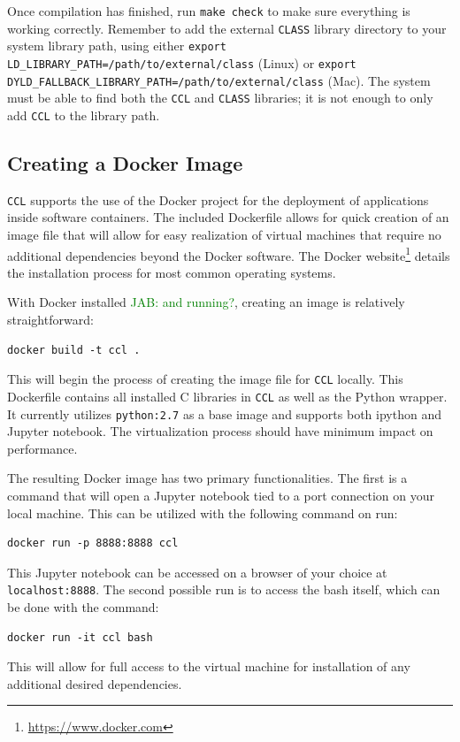 \documentclass[\docopts]{\docclass}
\newcommand{\jab}[1]{\textcolor{green}{JAB: #1}}
\begin{document}
Once compilation has finished, run {\tt make check} to make sure everything is working correctly. Remember to add the external {\tt CLASS} library directory to your system library path, using either {\tt export LD\_LIBRARY\_PATH=/path/to/external/class} (Linux) or {\tt export DYLD\_FALLBACK\_LIBRARY\_PATH=/path/to/external/class} (Mac). The system must be able to find both the {\tt CCL} and {\tt CLASS} libraries; it is not enough to only add {\tt CCL} to the library path.

\subsection{Creating a Docker Image}
{\tt CCL} supports the use of the Docker project for the deployment of applications inside software containers. The included Dockerfile allows for quick creation of an image file that will allow for easy realization of virtual machines that require no additional dependencies beyond the Docker software. The Docker website\footnote{\url{https://www.docker.com}} details the installation process for most common operating systems.

With Docker installed \jab{and running?}, creating an image is relatively straightforward:
\begin{verbatim}
docker build -t ccl .
\end{verbatim}
This will begin the process of creating the image file for {\tt CCL} locally. This Dockerfile contains all installed C libraries in {\tt CCL} as well as the Python wrapper. It currently utilizes {\tt python:2.7} as a base image and supports both ipython and Jupyter notebook. The virtualization process should have minimum impact on performance.

The resulting Docker image has two primary functionalities. The first is a command that will open a Jupyter notebook tied to a port connection on your local machine. This can be utilized with the following command on run:
\begin{verbatim}
docker run -p 8888:8888 ccl
\end{verbatim}
This Jupyter notebook can be accessed on a browser of your choice at {\tt localhost:8888}. The second possible run is to access the bash itself, which can be done with the command:
\begin{verbatim}
docker run -it ccl bash
\end{verbatim}
This will allow for full access to the virtual machine for installation of any additional desired dependencies.
\end{document}

